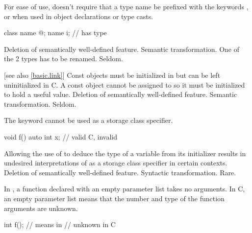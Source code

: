 \rationale
For ease of use, \Cpp{} doesn't require that a type name be prefixed
with the keywords ,  or  when used in object
declarations or type casts.

\begin{example}
\begin{codeblock}
class name { @\commentellip@ };
name i;                         //  has type 
\end{codeblock}
\end{example}

\effect
Deletion of semantically well-defined feature.
\difficulty
Semantic transformation.
One of the 2 types has to be renamed.
\howwide
Seldom.

 [see also \ref{basic.link}]
\change
Const objects must be initialized in \Cpp{} but can be left uninitialized in C.
\rationale
A const object cannot be assigned to so it must be initialized
to hold a useful value.
\effect
Deletion of semantically well-defined feature.
\difficulty
Semantic transformation.
\howwide
Seldom.

\change
The keyword  cannot be used as a storage class specifier.

\begin{example}
\begin{codeblock}
void f() {
  auto int x;       // valid C, invalid \Cpp{}
}
\end{codeblock}
\end{example}

\rationale
Allowing the use of  to deduce the type
of a variable from its initializer results in undesired interpretations of
 as a storage class specifier in certain contexts.
\effect
Deletion of semantically well-defined feature.
\difficulty
Syntactic transformation.
\howwide
Rare.

\change
In \Cpp{}, a function declared with an empty parameter list takes no arguments.
In C, an empty parameter list means that the number and type of the function arguments are unknown.

\begin{example}
\begin{codeblock}
int f();            // means    in \Cpp{}
                    //  unknown \tcode{)} in C
\end{codeblock}
\end{example}

